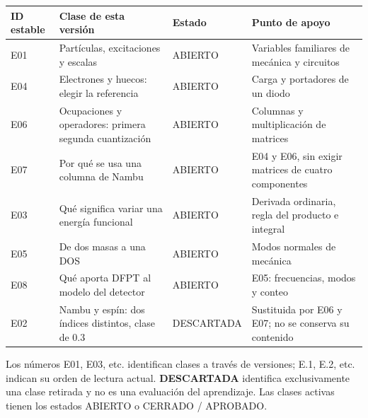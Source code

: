 \documentclass[
  spanish,
  10pt,
  a4paper,
]{article}
\newcounter{none} %
\begin{document}
{\def\LTcaptype{none} %
\begin{longtable}[]{@{}
  >{\raggedright\arraybackslash}p{}
  >{\raggedright\arraybackslash}p{}
  >{\raggedright\arraybackslash}p{}
  >{\raggedright\arraybackslash}p{}@{}}
\toprule\noalign{}
\begin{minipage}[b]{\linewidth}\raggedright
ID estable
\end{minipage} & \begin{minipage}[b]{\linewidth}\raggedright
Clase de esta versión
\end{minipage} & \begin{minipage}[b]{\linewidth}\raggedright
Estado
\end{minipage} & \begin{minipage}[b]{\linewidth}\raggedright
Punto de apoyo
\end{minipage} \\
\midrule\noalign{}
\endhead
\bottomrule\noalign{}
\endlastfoot
E01 & Partículas, excitaciones y escalas & ABIERTO & Variables
familiares de mecánica y circuitos \\
E04 & Electrones y huecos: elegir la referencia & ABIERTO & Carga y
portadores de un diodo \\
E06 & Ocupaciones y operadores: primera segunda cuantización & ABIERTO &
Columnas y multiplicación de matrices \\
E07 & Por qué se usa una columna de Nambu & ABIERTO & E04 y E06, sin
exigir matrices de cuatro componentes \\
E03 & Qué significa variar una energía funcional & ABIERTO & Derivada
ordinaria, regla del producto e integral \\
E05 & De dos masas a una DOS & ABIERTO & Modos normales de mecánica \\
E08 & Qué aporta DFPT al modelo del detector & ABIERTO & E05:
frecuencias, modos y conteo \\
E02 & Nambu y espín: dos índices distintos, clase de 0.3 & DESCARTADA &
Sustituida por E06 y E07; no se conserva su contenido \\
\end{longtable}
}

Los números E01, E03, etc. identifican clases a través de versiones;
E.1, E.2, etc. indican su orden de lectura actual. \textbf{DESCARTADA}
identifica exclusivamente una clase retirada y no es una evaluación del
aprendizaje. Las clases activas tienen los estados ABIERTO o CERRADO /
APROBADO.
\end{document}
